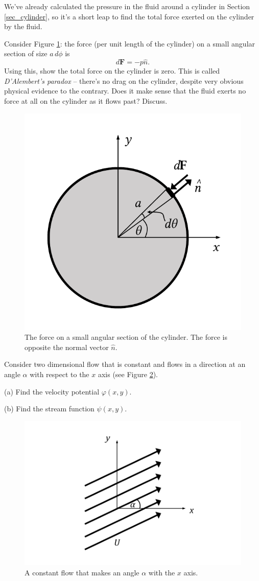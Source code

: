 \begin{problem}
\label{prob_force1}
We've already calculated the pressure in the fluid around a cylinder in Section \ref{sec_cylinder}, so it's a short leap to find the total force exerted on the cylinder by the fluid.

Consider Figure \ref{fig_cylinder_force}:  the force (per unit length of the cylinder) on a small angular section of size $a \, d\phi$ is
\[
d\textbf{F} = - p \hat{n}.
\]
Using this, show the total force on the cylinder is zero.  This is called \emph{D'Alembert's paradox} -- there's no drag on the cylinder, despite very obvious physical evidence to the contrary.  Does it make sense that the fluid exerts no force at all on the cylinder as it flows past?  Discuss.

\begin{figure}[t]
\centering\includegraphics[width=0.5\linewidth]{Figures/Chapter3/fig_cyl_force}
\caption{The force on a small angular section of the cylinder.  The force is opposite the normal vector $\hat{n}$.}
\label{fig_cylinder_force}
\end{figure}
\end{problem}


\begin{problem}
\label{prob_uniform_pot}
Consider two dimensional flow that is constant and flows in a direction at an angle $\alpha$ with respect to the $x$ axis (see Figure \ref{fig_uniform_flow_angle}).  

(a) Find the velocity potential $\varphi(x, y)$.

(b) Find the stream function $\psi(x, y)$.

\begin{figure}[t]
\centering\includegraphics[width=0.7\linewidth]{Figures/Chapter3/fig_uniform_flow_angle}
\caption{A constant flow that makes an angle $\alpha$ with the $x$ axis.}
\label{fig_uniform_flow_angle}
\end{figure}
\end{problem}

